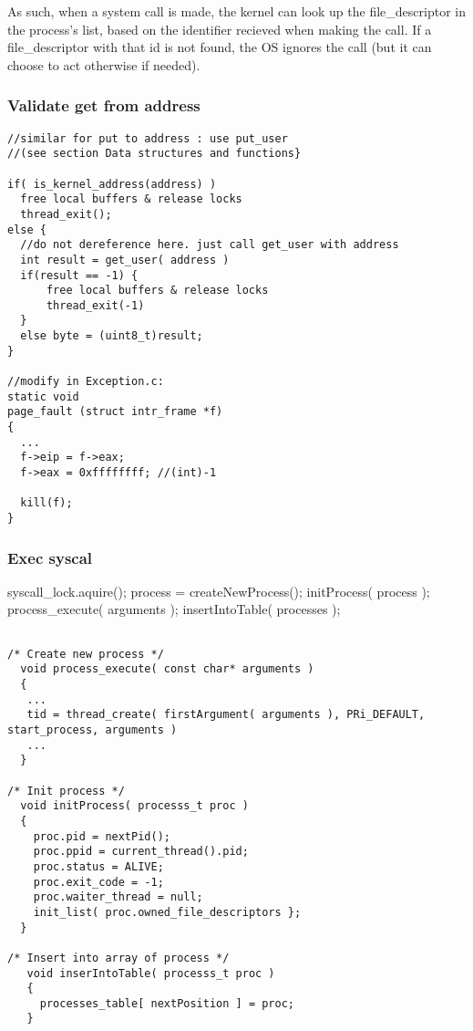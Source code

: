     As such, when a system call is made, the kernel can look up the file\_descriptor in the process's list, based on the identifier recieved when making the call. If a file\_descriptor with that id is not found, the OS ignores the call (but it can choose to act otherwise if needed).

    \subsubsection{Validate get from address}
    \vspace{-1em} %
      \begin{lstlisting}
//similar for put to address : use put_user
//(see section Data structures and functions}

if( is_kernel_address(address) )
  free local buffers & release locks
  thread_exit(); 
else {
  //do not dereference here. just call get_user with address
  int result = get_user( address ) 
  if(result == -1) {
      free local buffers & release locks
      thread_exit(-1)
  }	
  else byte = (uint8_t)result;
}

//modify in Exception.c:
static void
page_fault (struct intr_frame *f)
{
  ...
  f->eip = f->eax;
  f->eax = 0xffffffff; //(int)-1
  
  kill(f);
}
      \end{lstlisting}

    \subsubsection{Exec syscal}
    \vspace{-3em}
    \begin{program}
      syscall\_lock.aquire();
      process = createNewProcess();
      initProcess( process );
      process\_execute( arguments );
      insertIntoTable( processes );
    \end{program}

    \begin{lstlisting}
    
/* Create new process */
  void process_execute( const char* arguments )
  {
   ...
   tid = thread_create( firstArgument( arguments ), PRi_DEFAULT, start_process, arguments )
   ...
  }

/* Init process */
  void initProcess( processs_t proc )
  {
    proc.pid = nextPid();
    proc.ppid = current_thread().pid;
    proc.status = ALIVE;
    proc.exit_code = -1;
    proc.waiter_thread = null;
    init_list( proc.owned_file_descriptors };
  }

/* Insert into array of process */
   void inserIntoTable( processs_t proc )
   {
     processes_table[ nextPosition ] = proc;
   }
    
    \end{lstlisting}

